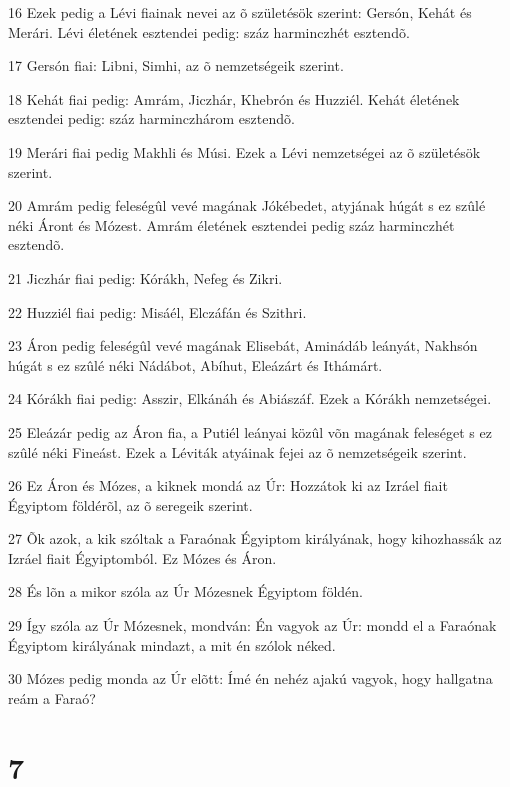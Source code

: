 \par 16 Ezek pedig a Lévi fiainak nevei az õ születésök szerint: Gersón, Kehát és Merári. Lévi életének esztendei pedig: száz harminczhét esztendõ.
\par 17 Gersón fiai: Libni, Simhi, az õ nemzetségeik szerint.
\par 18 Kehát fiai pedig: Amrám, Jiczhár, Khebrón és Huzziél. Kehát életének esztendei pedig: száz harminczhárom esztendõ.
\par 19 Merári fiai pedig Makhli és Músi. Ezek a Lévi nemzetségei az õ születésök szerint.
\par 20 Amrám pedig feleségûl vevé magának Jókébedet, atyjának húgát s ez szûlé néki Áront és Mózest. Amrám életének esztendei pedig száz harminczhét esztendõ.
\par 21 Jiczhár fiai pedig: Kórákh, Nefeg és Zikri.
\par 22 Huzziél fiai pedig: Misáél, Elczáfán és Szithri.
\par 23 Áron pedig feleségûl vevé magának Elisebát, Aminádáb leányát, Nakhsón húgát s ez szûlé néki Nádábot, Abíhut, Eleázárt és Ithámárt.
\par 24 Kórákh fiai pedig: Asszir, Elkánáh és Abiászáf. Ezek a Kórákh nemzetségei.
\par 25 Eleázár pedig az Áron fia, a Putiél leányai közûl võn magának feleséget s ez szûlé néki Fineást. Ezek a Léviták atyáinak fejei az õ nemzetségeik szerint.
\par 26 Ez Áron és Mózes, a kiknek mondá az Úr: Hozzátok ki az Izráel fiait Égyiptom földérõl, az õ seregeik szerint.
\par 27 Õk azok, a kik szóltak a Faraónak Égyiptom királyának, hogy kihozhassák az Izráel fiait Égyiptomból. Ez Mózes és Áron.
\par 28 És lõn a mikor szóla az Úr Mózesnek Égyiptom földén.
\par 29 Így szóla az Úr Mózesnek, mondván: Én vagyok az Úr: mondd el a Faraónak Égyiptom királyának mindazt, a mit én szólok néked.
\par 30 Mózes pedig monda az Úr elõtt: Ímé én nehéz ajakú vagyok, hogy hallgatna reám a Faraó?

\chapter{7}

